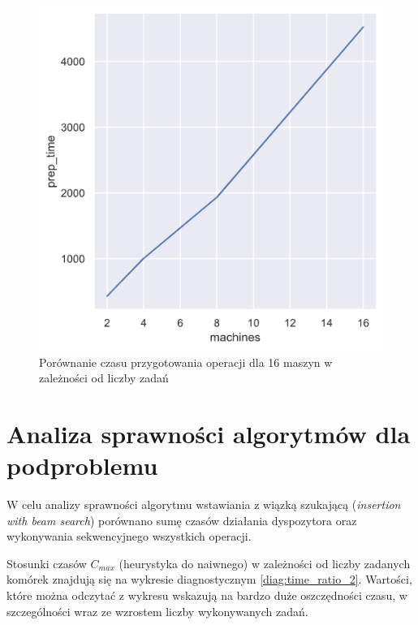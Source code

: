 \documentclass[brudnopis]{xmgr}
\begin{document}
\begin{figure}[!tbh]
\centering
\includegraphics[width=.8\hsize]{fig/relplot_16m.png}
\caption{Porównanie czasu przygotowania operacji dla 16 maszyn w zależności od liczby zadań\label{diag:relplot_16m}}
\end{figure}\medskip



\chapter{Analiza sprawności algorytmów dla podproblemu}

W celu analizy sprawności algorytmu wstawiania z wiązką szukającą (\emph{insertion with beam search}) porównano sumę czasów działania dyspozytora oraz wykonywania sekwencyjnego wszystkich operacji.

Stosunki czasów $C_{max}$ (heurystyka do naiwnego) w zależności od liczby zadanych komórek znajdują się na wykresie diagnostycznym \ref{diag:time_ratio_2}. Wartości, które można odczytać z wykresu wskazują na bardzo duże oszczędności czasu, w szczególności wraz ze wzrostem liczby wykonywanych zadań.
\end{document}
